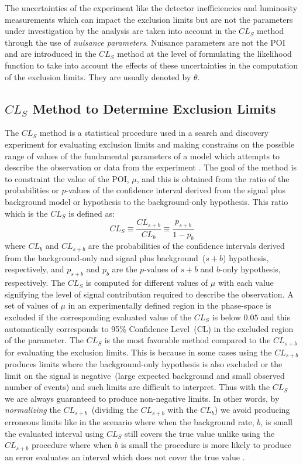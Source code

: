The uncertainties of the experiment like the detector inefficiencies and luminosity measurements which can impact the exclusion limits but are not the parameters under investigation by the analysis are taken into account in the $CL_{S}$ method through the use of \textit{nuisance parameters}. Nuisance parameters  are not the POI and are introduced in the $CL_{S}$ method at the level of formulating the likelihood function to take into account the effects of these uncertainties in the computation of the exclusion limits. They are usually denoted by $\mathbb{\theta}$.

\subsection{$CL_{S}$ Method to Determine Exclusion Limits}
The $CL_{S}$ method is a statistical procedure used in a search and discovery experiment for evaluating exclusion limits and making constrains on the possible range of values of the fundamental parameters of a model which attempts to describe the observation or data from the experiment \cite{CLS}. The goal of the method is to constraint the value of the POI, $\mu$, and this is obtained from the ratio of the probabilities or $p$-values of the confidence interval derived from the signal plus background model or hypothesis to the background-only hypothesis. This ratio which is the $CL_{S}$ is defined as: 
\begin{equation}
CL_{S}  \equiv  \frac{CL_{s+b}}{CL_{b}} \equiv \frac{p_{s+b}}{1 - p_{b}}
\end{equation}
where $CL_{b}$ and $CL_{s+b}$ are the  probabilities of the confidence intervals derived from the background-only and signal plus background~($s+b$) hypothesis, respectively, and $p_{s+b}$ and $p_{b}$ are the $p$-values of $s+b$ and $b$-only hypothesis, respectively. 
The $CL_{S}$ is computed for different values of $\mu$ with each value signifying the level of signal contribution required to describe the observation. A set of values of $\mu$ in an experimentally defined region in the phase-space is excluded if the corresponding evaluated value of the $CL_{S}$ is below $0.05$ and this automatically corresponds to 95\% Confidence Level~(CL) in the excluded region of the parameter.
\newline
The $CL_{S}$ is the most favorable method compared to the $CL_{s+b}$ for evaluating the exclusion limits. This is because in some cases using the $CL_{s+b}$ produces limits where the background-only hypothesis is also excluded or the limit on the signal is negative~(large expected background and small observed number of events) and such limits are difficult to interpret. Thus with the $CL_{S}$ we are always guaranteed to produce non-negative limits. In other words, by \textit{normalizing} the $CL_{s+b}$~(dividing the $CL_{s+b}$ with the $CL_{b}$) we avoid producing erroneous limits like in the scenario where when the background rate, $b$, is small the evaluated interval using $CL_{S}$ still covers the true value unlike using the $CL_{s+b}$ procedure where when $b$ is small the procedure is more likely to produce an error \ie evaluates an interval which does not cover the true value \cite{LIM}. 

